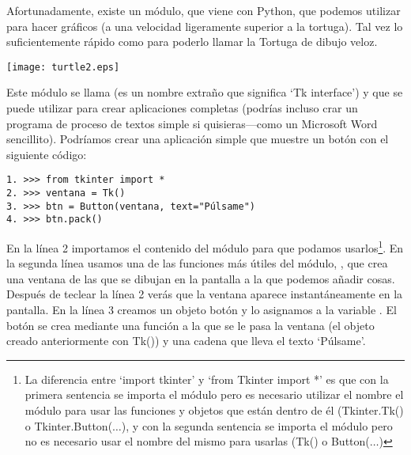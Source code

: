 Afortunadamente, existe un módulo, que viene con Python, que podemos utilizar para hacer gráficos (a una velocidad ligeramente superior a la tortuga). Tal vez lo suficientemente rápido como para poderlo llamar la Tortuga de dibujo veloz. 


\begin{center}
\texttt{[image: turtle2.eps]}
\end{center}

Este módulo se llama  (es un nombre extraño que significa `Tk interface') y que se puede utilizar para crear aplicaciones completas (podrías incluso crar un programa de proceso de textos simple si quisieras---como un Microsoft Word sencillito). Podríamos crear una aplicación simple que muestre un botón con el siguiente código:

\begin{listing}
\begin{verbatim}
1. >>> from tkinter import *
2. >>> ventana = Tk()
3. >>> btn = Button(ventana, text="Púlsame")
4. >>> btn.pack()
\end{verbatim}
\end{listing}

En la línea 2 importamos el contenido del módulo  para que podamos usarlos\footnote{La diferencia entre `import tkinter' y `from Tkinter import *' es que con la primera sentencia se importa el módulo pero es necesario utilizar el nombre el módulo para usar las funciones y objetos que están dentro de él (Tkinter.Tk() o Tkinter.Button($\ldots$), y con la segunda sentencia se importa el módulo pero no es necesario usar el nombre del mismo para usarlas (Tk() o Button($\ldots$)}. En la segunda línea usamos una de las funciones más útiles del módulo, , que crea una ventana de las que se dibujan en la pantalla a la que podemos añadir cosas.  Después de teclear la línea 2 verás que la ventana aparece instantáneamente en la pantalla. En la línea 3 creamos un objeto botón y lo asignamos a la variable .  El botón se crea mediante una función a la que se le pasa la ventana (el objeto creado anteriormente con Tk()) y una cadena que lleva el texto `Púlsame'.

